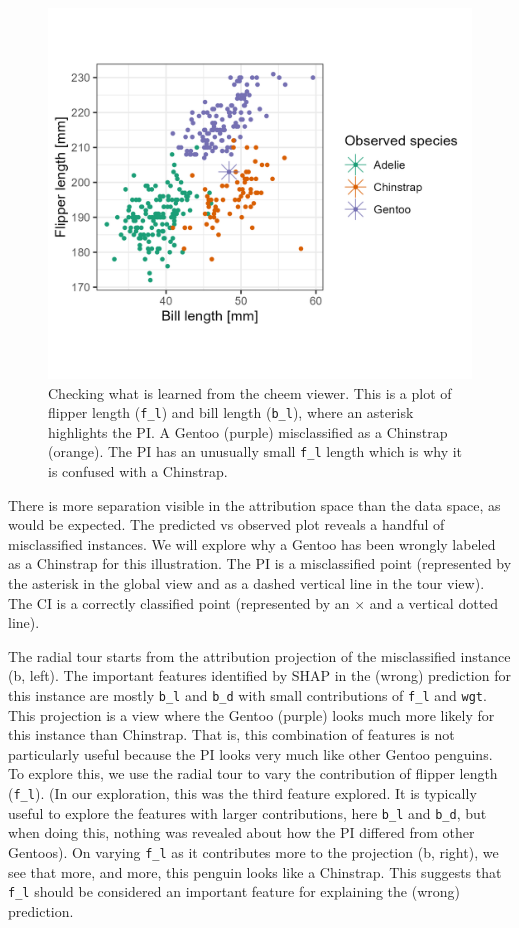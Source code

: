\documentclass[
]{article}
\begin{document}
\begin{figure}

{\centering \includegraphics[width=0.6\linewidth]{./figures/case_penguins_BlFl} 

}

\caption{Checking what is learned from the cheem viewer. This is a plot of flipper length (\texttt{f\_l}) and bill length (\texttt{b\_l}), where an asterisk highlights the PI. A Gentoo (purple) misclassified as a Chinstrap (orange). The PI has an unusually small \texttt{f\_l} length which is why it is confused with a Chinstrap.}\label{fig:casepenguinsblfl}
\end{figure}

There is more separation visible in the attribution space than the data space, as would be expected. The predicted vs observed plot reveals a handful of misclassified instances. We will explore why a Gentoo has been wrongly labeled as a Chinstrap for this illustration. The PI is a misclassified point (represented by the asterisk in the global view and as a dashed vertical line in the tour view). The CI is a correctly classified point (represented by an \(\times\) and a vertical dotted line).

The radial tour starts from the attribution projection of the misclassified instance (b, left). The important features identified by SHAP in the (wrong) prediction for this instance are mostly \texttt{b\_l} and \texttt{b\_d} with small contributions of \texttt{f\_l} and \texttt{wgt}. This projection is a view where the Gentoo (purple) looks much more likely for this instance than Chinstrap. That is, this combination of features is not particularly useful because the PI looks very much like other Gentoo penguins. To explore this, we use the radial tour to vary the contribution of flipper length (\texttt{f\_l}). (In our exploration, this was the third feature explored. It is typically useful to explore the features with larger contributions, here \texttt{b\_l} and \texttt{b\_d}, but when doing this, nothing was revealed about how the PI differed from other Gentoos). On varying \texttt{f\_l} as it contributes more to the projection (b, right), we see that more, and more, this penguin looks like a Chinstrap. This suggests that \texttt{f\_l} should be considered an important feature for explaining the (wrong) prediction.
\end{document}
